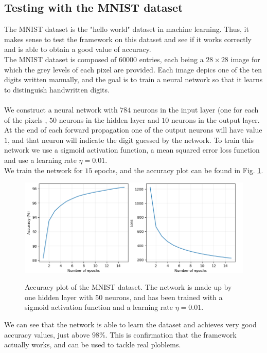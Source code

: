 \documentclass[12pt]{article}
\begin{document}
\subsection{Testing with the MNIST dataset}
The MNIST dataset is the "hello world" dataset in machine learning. Thus, it makes sense to test the 
framework on this dataset and see if it works correctly and is able to obtain a good value of accuracy. \\ 
The MNIST dataset is composed of $60000$ entries, each being a $28\times 28$ image for which the grey
levels of each pixel are provided. Each image depics one of the ten digits written manually, and the goal
is to train a neural network so that it learns to distinguish handwritten digits. \\ \\
We construct a neural network with $784$ neurons in the input layer (one for each of the pixels 
, $50$ neurons in the hidden layer and $10$ neurons in the output layer. At the end of each forward 
propagation one of the output neurons will have value $1$, and that neuron will indicate the digit 
guessed by the network. To train this network we use a sigmoid activation function, a mean squared error 
loss function and use a learning rate $\eta = 0.01$. \\
We train the network for $15$ epochs, and the accuracy plot can be found in Fig. \ref{mnist}.
\begin{figure}[h]
  \centering
  \includegraphics[scale=0.5]{./img/mnist.png}	
  \label{mnist}
  \caption{Accuracy plot of the MNIST dataset. The network is made up by one hidden layer with $50$ neurons, 
  and has been trained with a sigmoid activation function and a learning rate $\eta = 0.01$.}
\end{figure}
We can see that the network is able to learn the dataset and achieves very good accuracy values, just above
$98 \%$. This is confirmation that the framework actually works, and can be used to tackle real ploblems.
\newpage
\pagebreak
\end{document}
